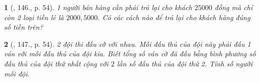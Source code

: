 \documentclass{article}
\newtheorem{baitoan}{}
\begin{document}
\begin{baitoan}[\cite{Tuyen_Toan_9_old}, 146., p. 54]
	1 người bán hàng cần phải trả lại cho khách $25000$ đồng mà chỉ còn 2 loại tiền lẻ là $2000,5000$. Có các cách nào để trả lại cho khách hàng đúng số tiền trên?
\end{baitoan}

\begin{baitoan}[\cite{Tuyen_Toan_9_old}, 147., p. 54]
	2 đội thi đấu cờ với nhau. Mỗi đấu thủ của đội này phải đấu 1 ván với mỗi đấu thủ của đội kia. Biết tổng số ván cờ đã đấu bằng bình phương số đấu thủ của đội thứ nhất cộng với $2$ lần số đấu thủ của đội thứ 2. Tính số người mỗi đội.
\end{baitoan}

\end{document}
